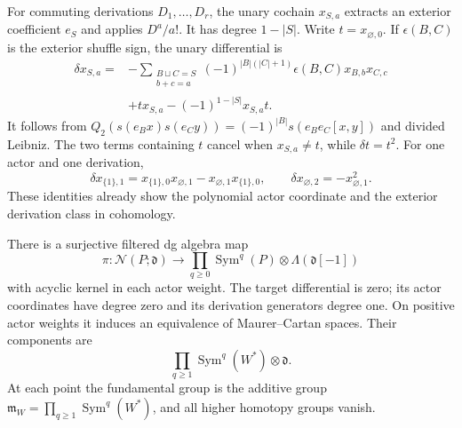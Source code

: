 For commuting derivations $D_1,\ldots,D_r$, the unary cochain
$x_{S,a}$ extracts an exterior coefficient $e_S$ and applies
$D^a/a!$. It has degree $1-|S|$. Write $t=x_{\varnothing,0}$.
If $\epsilon(B,C)$ is the exterior shuffle sign, the unary
differential is
\begin{equation}\label{eq:vol2-natural-differential}
\begin{aligned}
 \delta x_{S,a}
 ={}&-\sum_{\substack{B\sqcup C=S\\b+c=a}}
       (-1)^{|B|(|C|+1)}\epsilon(B,C)x_{B,b}x_{C,c}\\
    &+tx_{S,a}-(-1)^{1-|S|}x_{S,a}t.
\end{aligned}
\end{equation}
It follows from
$Q_2(s(e_Bx)s(e_Cy))=(-1)^{|B|}s(e_Be_C[x,y])$
and divided Leibniz. The two terms containing $t$ cancel when
$x_{S,a}\ne t$, while $\delta t=t^2$.
For one actor and one derivation,
\[
 \delta x_{\{1\},1}=x_{\{1\},0}x_{\varnothing,1}
                      -x_{\varnothing,1}x_{\{1\},0},
 \qquad \delta x_{\varnothing,2}=-x_{\varnothing,1}^2.
\]
These identities already show the polynomial actor coordinate and
the exterior derivation class in cohomology.

\begin{theorem}\label{thm:vol2-natural-cohomology}
There is a surjective filtered dg algebra map
\begin{equation}\label{eq:vol2-natural-projection}
 \pi:\mathcal N(P;\mathfrak d)\longrightarrow
          \prod_{q\geq0}\operatorname{Sym}^q(P)
                     \otimes\Lambda(\mathfrak d[-1])
\end{equation}
with acyclic kernel in each actor weight. The target differential
is zero; its actor coordinates have degree zero and its derivation
generators degree one. On positive actor weights it induces an
equivalence of Maurer--Cartan spaces. Their components are
\begin{equation}\label{eq:vol2-natural-classes}
 \prod_{q\geq1}\operatorname{Sym}^q(W^*)\otimes\mathfrak d.
\end{equation}
At each point the fundamental group is the additive group
$\mathfrak m_W=\prod_{q\geq1}\operatorname{Sym}^q(W^*)$,
and all higher homotopy groups vanish.
\end{theorem}

